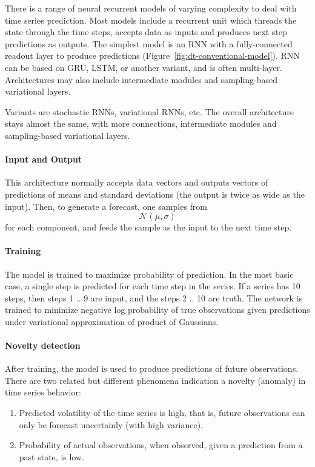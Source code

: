 \documentclass{paper}
\begin{document}
There is a range of neural recurrent models of varying complexity to
deal with time series prediction. Most models include a
recurrent unit which threads the state through the time steps,
accepts data as inputs and produces next step predictions as
outputs. The simplest model is an RNN with a fully-connected
readout layer to produce predictions (Figure~\ref{fig:dt-conventional-model}).
RNN can be based on GRU, LSTM, or another variant, and is often
multi-layer. Architectures  may also include intermediate modules and sampling-based variational layers.

Variants are stochastic RNNs, variational RNNs, etc. The
overall architecture stays almost the same, with more
connections, intermediate modules and sampling-based variational
layers.

\paragraph{Input and Output} This architecture normally accepts data vectors and outputs vectors of predictions of means and standard deviations (the output is twice as wide as the input). Then, to generate a forecast, one samples from $$\mathcal{N}(\mu, \sigma)$$ for each component, and feeds the sample as the input to the next time step.

\paragraph{Training} The model is trained to maximize probability of prediction. In the most basic case, a single step is predicted for each time step in the series. If a series has 10 steps, then steps 1 .. 9 are input, and the steps 2 .. 10 are truth. The network is trained to
minimize negative log probability of true observations given
predictions under variational approximation of product of
Gaussians. 

\paragraph{Novelty detection} After training, the model is used to produce predictions of future observations. There are two related but different phenomena indication a novelty (anomaly) in time series behavior: \begin{enumerate}
    \item Predicted volatility of the time series is high, that is, future observations can only be forecast uncertainly (with high variance). 
    \item Probability of actual observations, when observed, given a prediction from a past state, is low.
\end{enumerate}
\end{document}
